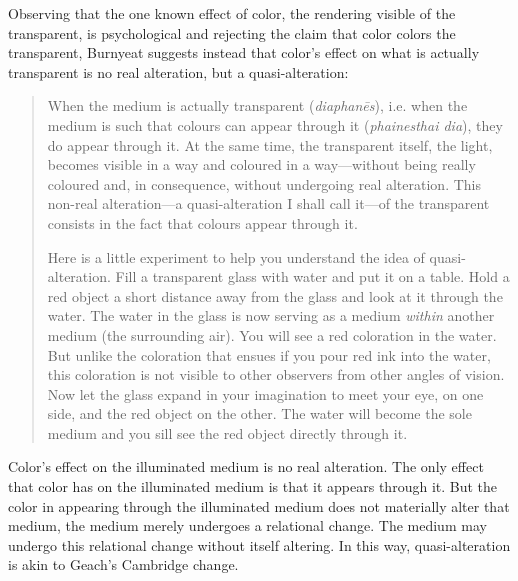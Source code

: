 Observing that the one known effect of color, the rendering visible of the transparent, is psychological and rejecting the claim that color colors the transparent, Burnyeat suggests instead that color's effect on what is actually transparent is no real alteration, but a quasi-alteration:
\begin{quotation}
	\noindent When the medium is actually transparent (\emph{diaphan\={e}s}), i.e. when the medium is such that colours can appear through it (\emph{phainesthai dia}), they do appear through it. At the same time, the transparent itself, the light, becomes visible in a way and coloured in a way---without being really coloured and, in consequence, without undergoing real alteration. This non-real alteration---a quasi-alteration I shall call it---of the transparent consists in the fact that colours appear through it.
	
	Here is a little experiment to help you understand the idea of quasi-alteration. Fill a transparent glass with water and put it on a table. Hold a red object a short distance away from the glass and look at it through the water. The water in the glass is now serving as a medium \emph{within} another medium (the surrounding air). You will see a red coloration in the water. But unlike the coloration that ensues if you pour red ink into the water, this coloration is not visible to other observers from other angles of vision. Now let the glass expand in your imagination to meet your eye, on one side, and the red object on the other. The water will become the sole medium and you sill see the red object directly through it. \citep[425]{Burnyeat:1995fk}
\end{quotation}
Color's effect on the illuminated medium is no real alteration. The only effect that color has on the illuminated medium is that it appears through it. But the color in appearing through the illuminated medium does not materially alter that medium, the medium merely undergoes a relational change. The medium may undergo this relational change without itself altering. In this way, quasi-alteration is akin to Geach's \citeyearpar[71--72]{Geach:1969aa} Cambridge change.

